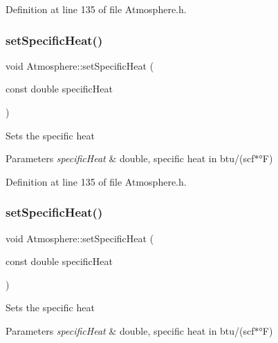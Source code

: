 Definition at line 135 of file Atmosphere.\+h.

\mbox{\label{class_atmosphere_a17450de3bc7a64b2736b1fe8785410cd}} 
\subsubsection{\texorpdfstring{set\+Specific\+Heat()}{setSpecificHeat()}\hspace{0.1cm}{\footnotesize\ttfamily [2/3]}}
{\footnotesize\ttfamily void Atmosphere\+::set\+Specific\+Heat (\begin{DoxyParamCaption}\item[{const double}]{specific\+Heat }\end{DoxyParamCaption})\hspace{0.3cm}{\ttfamily [inline]}}

Sets the specific heat 
\begin{DoxyParams}{Parameters}
{\em specific\+Heat} & double, specific heat in btu/(scf$\ast$°F) \\
\hline
\end{DoxyParams}


Definition at line 135 of file Atmosphere.\+h.

\mbox{\label{class_atmosphere_a17450de3bc7a64b2736b1fe8785410cd}} 
\subsubsection{\texorpdfstring{set\+Specific\+Heat()}{setSpecificHeat()}\hspace{0.1cm}{\footnotesize\ttfamily [3/3]}}
{\footnotesize\ttfamily void Atmosphere\+::set\+Specific\+Heat (\begin{DoxyParamCaption}\item[{const double}]{specific\+Heat }\end{DoxyParamCaption})\hspace{0.3cm}{\ttfamily [inline]}}

Sets the specific heat 
\begin{DoxyParams}{Parameters}
{\em specific\+Heat} & double, specific heat in btu/(scf$\ast$°F) \\
\hline
\end{DoxyParams}


